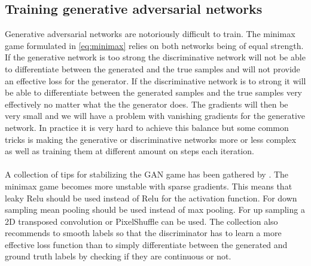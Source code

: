 \documentclass{kththesis}
\begin{document}
\subsection{Training generative adversarial networks}
Generative adversarial networks are notoriously difficult to train. The minimax game formulated in \ref{eq:minimax} relies on both networks being of equal strength. If the generative network is too strong the discriminative network will not be able to differentiate between the generated and the true samples and will not provide an effective loss for the generator. If the discriminative network is to strong it will be able to differentiate between the generated samples and the true samples very effectively no matter what the the generator does. The gradients will then be very small and we will have a problem with vanishing gradients for the generative network. In practice it is very hard to achieve this balance but some common tricks is making the generative or discriminative networks more or less complex as well as training them at different amount on steps each iteration.\\
\\
A collection of tips for stabilizing the GAN game has been gathered by \parencite{chintala_ganhacks:_2018}.
The minimax game becomes more unstable with sparse gradients. This means that leaky Relu should be used instead of Relu for the activation function. For down sampling mean pooling should be used instead of max pooling. For up sampling a 2D transposed convolution or PixelShuffle \parencite{shi_real-time_2016} can be used. The collection also recommends to smooth labels so that the discriminator has to learn a more effective loss function than to simply differentiate between the generated and ground truth labels by checking if they are continuous or not.
\end{document}
